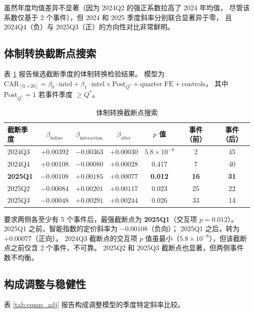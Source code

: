\documentclass[11pt,fontset=fandol,a4paper]{ctexart}
\begin{document}
虽然年度均值差异不显著（因为 2024Q2 的强正系数拉高了 2024 年均值，
尽管该系数仅基于 2 个事件），但 2024 和 2025 季度斜率分别联合显著异于零，
且 2024Q4（负）与 2025Q3（正）的方向性对比非常鲜明。

\subsection{体制转换截断点搜索}

表 \ref{tab:cutoff} 报告候选截断季度的体制转换检验结果。
模型为 $\text{CAR}_{[0,+20]} = \beta_0\cdot\text{intel} + \beta_1\cdot\text{intel}\times\text{Post}_{Q^*} + \text{quarter FE} + \text{controls}$，
其中 $\text{Post}_{Q^*}=1$ 若事件季度 $\geq Q^*$。

\begin{table}[htbp]
\centering
\caption{体制转换截断点搜索}
\label{tab:cutoff}
\small
\begin{tabular}{lcccccc}
\toprule
截断季度 & $\beta_{\text{before}}$ & $\beta_{\text{interaction}}$ & $\beta_{\text{after}}$ & $p$ 值 & 事件（前） & 事件（后） \\
\midrule
2024Q3 & $+0.00392$  & $-0.00363$ & $+0.00030$ & $5.8\times10^{-8}$ & 2  & 45 \\
2024Q4 & $+0.00108$  & $-0.00080$ & $+0.00028$ & 0.417 & 7  & 40 \\
\textbf{2025Q1} & \textbf{$-0.00108$} & \textbf{$+0.00185$} & \textbf{$+0.00077$} & \textbf{0.012} & \textbf{16} & \textbf{31} \\
2025Q2 & $-0.00084$  & $+0.00201$ & $+0.00117$ & 0.023 & 25 & 22 \\
2025Q3 & $-0.00048$  & $+0.00291$ & $+0.00244$ & 0.026 & 33 & 14 \\
\bottomrule
\end{tabular}
\end{table}

要求两侧各至少有 5 个事件后，最强截断点为 \textbf{2025Q1}（交互项 $p=0.012$）。
2025Q1 之前，智能指数的定价斜率为 $-0.00108$（负向）；
2025Q1 之后，转为 $+0.00077$（正向）。
2024Q3 截断点的交互项 $p$ 值虽最小（$5.8\times10^{-8}$），但该截断点之前仅含 2 个事件，不可靠。
2025Q2 和 2025Q3 截断点也显著，但两侧事件数不均衡。

\subsection{构成调整与稳健性}

表 \ref{tab:comp_adj} 报告构成调整模型的季度特定斜率比较。
\end{document}

